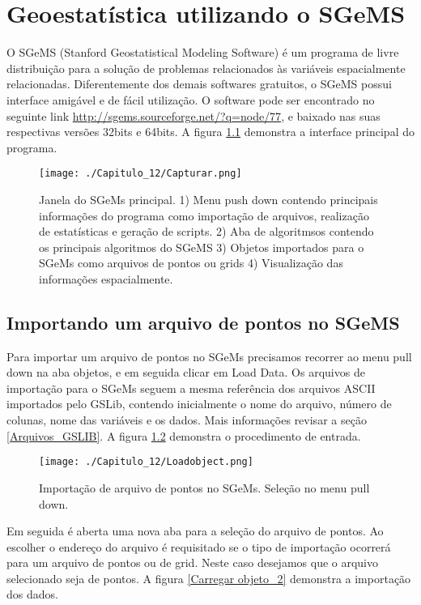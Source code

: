
\chapter{Geoestatística utilizando o SGeMS}

O SGeMS (Stanford Geostatistical Modeling Software) é um programa de livre distribuição para a solução de problemas relacionados às variáveis espacialmente relacionadas. Diferentemente dos demais softwares gratuitos, o SGeMS possui interface amigável e de fácil utilização. O software pode ser encontrado no seguinte link \url{http://sgems.sourceforge.net/?q=node/77},  e baixado nas suas respectivas versões 32bits e 64bits. A figura \ref{janela_principal} demonstra a interface principal do programa. 

\FloatBarrier
\begin{figure}[h]
	\centering
	\texttt{[image: ./Capitulo\_12/Capturar.png]}	
	\caption{ Janela do SGeMs principal. 1) Menu push down contendo principais informações do programa como importação de arquivos, realização de estatísticas e geração de scripts. 2) Aba de algoritmsos contendo os principais algoritmos do SGeMS 3) Objetos importados para o SGeMs como arquivos de pontos ou grids 4) Visualização das informações espacialmente. }
	\label{janela_principal}
\end{figure}
\FloatBarrier

\section{Importando um arquivo de pontos no SGeMS}

Para importar um arquivo de pontos no SGeMs precisamos recorrer ao menu pull down na aba objetos, e em seguida clicar em Load Data. Os arquivos de importação para o SGeMs seguem a mesma referência dos arquivos ASCII importados pelo GSLib, contendo inicialmente o nome do arquivo, número de colunas, nome das variáveis e os dados. Mais informações revisar a seção \ref{Arquivos_GSLIB}.  A figura \ref{Carregar objeto} demonstra o procedimento de entrada. 

\FloatBarrier
\begin{figure}[h]
	\centering
	\texttt{[image: ./Capitulo\_12/Loadobject.png]}	
	\caption{ Importação de arquivo de pontos no SGeMs. Seleção no menu pull down. }
	\label{Carregar objeto}
\end{figure}
\FloatBarrier

Em seguida é aberta uma nova aba para a seleção do arquivo de pontos. Ao escolher o endereço do arquivo é requisitado se o tipo de importação ocorrerá para um arquivo de pontos ou de grid. Neste caso desejamos que o arquivo selecionado seja de pontos. A figura \ref{Carregar objeto_2} demonstra a importação dos dados.


